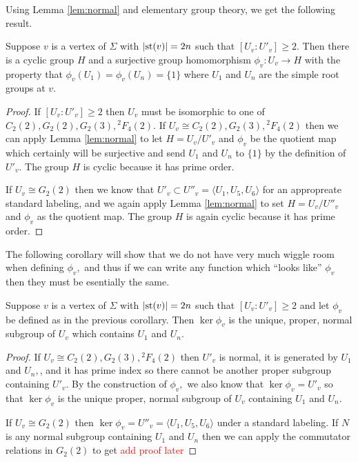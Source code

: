 \documentclass[class=book, crop=false,12 pt]{standalone}
\begin{document}
Using Lemma \ref{lem:normal} and elementary group theory, we get the following result.
\begin{cor}
	\label{cor:phiv}
	Suppose $v$ is a vertex of $\Sigma$ with $|\mathrm{st}(v)|=2n$ such that $[U_v:U'_v]\ge 2.$ Then there is a cyclic group $H$ and a surjective group homomorphism $\phi_v:U_v\to H$ with the property that $\phi_v(U_1)=\phi_v(U_n)=\{1\}$ where $U_1$ and $U_n$ are the simple root groups at $v.$
\end{cor}
\begin{proof}
	If $[U_v:U'_v]\ge 2$ then $U_v$ must be isomorphic to one of $C_2(2),G_2(2),G_2(3),{}^2F_4(2).$ If $U_v\cong C_2(2),G_2(3),{}^2F_4(2)$ then we can apply Lemma \ref{lem:normal} to let $H=U_v/U'_v$ and $\phi_v$ be the quotient map which certainly will be surjective and send $U_1$ and $U_n$ to $\{1\}$ by the definition of $U'_v.$ The group $H$ is cyclic because it has prime order.

	If $U_v\cong G_2(2)$ then we know that $U'_v\subset U''_v=\langle U_1,U_5,U_6\rangle$ for an appropreate standard labeling, and we again apply Lemma \ref{lem:normal} to set $H=U_v/U''_v$ and $\phi_v$ as the quotient map. The group $H$ is again cyclic because it has prime order.
\end{proof}

The following corollary will show that we do not have very much wiggle room when defining $\phi_v,$ and thus if we can write any function which ``looks like'' $\phi_v$ then they must be esentially the same.
\begin{cor}
	\label{cor:uniquephiv}
	Suppose $v$ is a vertex of $\Sigma$ with $|\mathrm{st}(v)|=2n$ such that $[U_v:U'_v]\ge 2$ and let $\phi_v$ be defined as in the previous corollary. Then $\ker \phi_v$ is the unique, proper, normal subgroup of $U_v$ which contains $U_1$ and $U_n.$
\end{cor}
\begin{proof}
	If $U_v\cong C_2(2),G_2(3),{}^2F_4(2)$ then $U'_v$ is normal, it is generated by $U_1$ and $U_n,$, and it has prime index so there cannot be another proper subgroup containing $U'_v.$ By the construction of $\phi_v,$ we also know that $\ker \phi_v=U'_v$ so that $\ker\phi_v$ is the unique proper, normal subgroup of $U_v$ containing $U_1$ and $U_n.$

	If $U_v\cong G_2(2)$ then $\ker \phi_v=U''_v=\langle U_1,U_5,U_6\rangle$ under a standard labeling. If $N$ is any normal subgroup containing $U_1$ and $U_n$ then we can apply the commutator relations in $G_2(2)$ to get \textcolor{red}{add proof later}
\end{proof}
\end{document}
